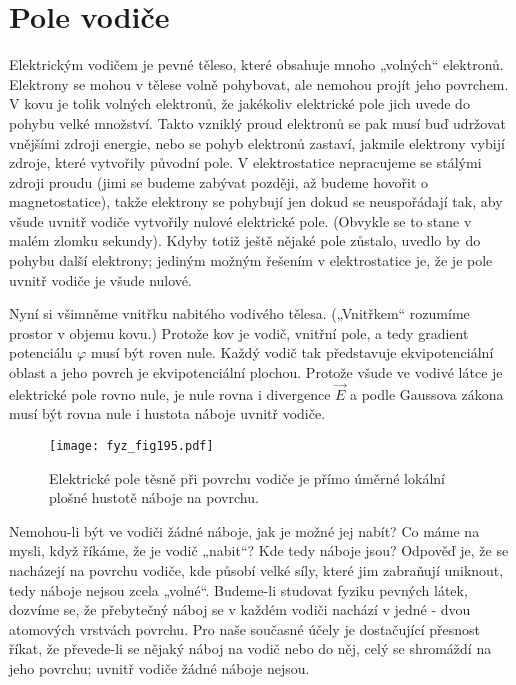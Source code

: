 {\section{Pole vodiče}\label{fyz:IIchapVsecVIII}
  Elektrickým vodičem je pevné těleso, které obsahuje mnoho „volných“ elektronů. Elektrony se 
  mohou v tělese volně pohybovat, ale nemohou projít jeho povrchem. V kovu je tolik volných 
  elektronů, že jakékoliv elektrické pole jich uvede do pohybu velké množství. Takto vzniklý 
  proud elektronů se pak musí buď udržovat vnějšími zdroji energie, nebo se pohyb elektronů 
  zastaví, jakmile elektrony vybijí zdroje, které vytvořily původní pole. V elektrostatice 
  nepracujeme se stálými zdroji proudu (jimi se budeme zabývat později, až budeme hovořit o 
  magnetostatice), takže elektrony se pohybují jen dokud se neuspořádají tak, aby všude uvnitř 
  vodiče vytvořily nulové elektrické pole. (Obvykle se to stane v malém zlomku sekundy). Kdyby 
  totiž ještě nějaké pole zůstalo, uvedlo by do pohybu další elektrony; jediným možným řešením 
  v elektrostatice je, že je pole uvnitř vodiče je všude nulové.
  
  Nyní si všimněme vnitřku nabitého vodivého tělesa. („Vnitřkem“ rozumíme prostor v objemu 
  kovu.) Protože kov je vodič, vnitřní pole, a tedy gradient potenciálu \(\varphi\) musí být 
  roven nule. Každý vodič tak představuje ekvipotenciální oblast a jeho povrch je 
  ekvipotenciální plochou. Protože všude ve vodivé látce je elektrické pole rovno nule, je nule 
  rovna i divergence \(\vec{E}\) a podle Gaussova zákona musí být rovna nule i hustota náboje 
  uvnitř vodiče.

  \begin{figure}[ht!]  %
    \centering
    \texttt{[image: fyz\_fig195.pdf]}
    \caption{Elektrické pole těsně při povrchu vodiče je přímo úměrné lokální plošné hustotě  
             náboje na povrchu.}
    \label{fyz:fig195}
  \end{figure} 
  Nemohou-li být ve vodiči žádné náboje, jak je možné jej nabít? Co máme na mysli, když říkáme, 
  že je vodič „nabit“? Kde tedy náboje jsou? Odpověď je, že se nacházejí na povrchu vodiče, kde 
  působí velké síly, které jim zabraňují uniknout, tedy náboje nejsou zcela „volné“. Budeme-li 
  studovat fyziku pevných látek, dozvíme se, že přebytečný náboj se v každém vodiči nachází v 
  jedné - dvou atomových vrstvách povrchu. Pro naše současné účely je dostačující přesnost 
  říkat, že převede-li se nějaký náboj na vodič nebo do něj, celý se shromáždí na jeho povrchu; 
  uvnitř vodiče žádné náboje nejsou. 
  
}
